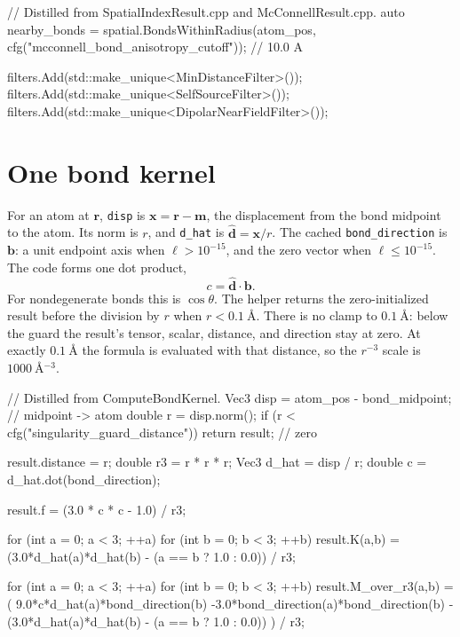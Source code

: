 \documentclass[11pt]{article}
\newcommand{\code}[1]{\texttt{#1}}
\begin{document}
\begin{codebox}
// Distilled from SpatialIndexResult.cpp and McConnellResult.cpp.
auto nearby_bonds =
    spatial.BondsWithinRadius(atom_pos,
        cfg("mcconnell_bond_anisotropy_cutoff"));  // 10.0 A

filters.Add(std::make_unique<MinDistanceFilter>());
filters.Add(std::make_unique<SelfSourceFilter>());
filters.Add(std::make_unique<DipolarNearFieldFilter>());
\end{codebox}

\section{One bond kernel}

For an atom at \(\bm r\), \code{disp} is
\(\bm x=\bm r-\bm m\), the displacement from the bond midpoint to the atom.
Its norm is \(r\), and \code{d\_hat} is
\(\hat{\bm d}=\bm x/r\). The cached \code{bond\_direction} is
\(\bm b\): a unit endpoint axis when \(\ell>10^{-15}\), and the zero vector
when \(\ell\le 10^{-15}\). The code forms one dot product,
\[
  c = \hat{\bm d}\cdot\bm b .
\]
For nondegenerate bonds this is \(\cos\theta\).
The helper returns the zero-initialized result before the division by \(r\)
when \(r<\SI{0.1}{\angstrom}\). There is no clamp to
\(\SI{0.1}{\angstrom}\): below the guard the result's tensor, scalar, distance,
and direction stay at zero. At exactly \(\SI{0.1}{\angstrom}\) the formula is
evaluated with that distance, so the \(r^{-3}\) scale is
\(\SI{1000}{\angstrom^{-3}}\).

\begin{codebox}
// Distilled from ComputeBondKernel.
Vec3 disp = atom_pos - bond_midpoint;      // midpoint -> atom
double r = disp.norm();
if (r < cfg("singularity_guard_distance")) return result;  // zero

result.distance = r;
double r3 = r * r * r;
Vec3 d_hat = disp / r;
double c = d_hat.dot(bond_direction);

result.f = (3.0 * c * c - 1.0) / r3;

for (int a = 0; a < 3; ++a)
    for (int b = 0; b < 3; ++b)
        result.K(a,b) =
            (3.0*d_hat(a)*d_hat(b) - (a == b ? 1.0 : 0.0)) / r3;

for (int a = 0; a < 3; ++a)
    for (int b = 0; b < 3; ++b)
        result.M_over_r3(a,b) =
            ( 9.0*c*d_hat(a)*bond_direction(b)
             -3.0*bond_direction(a)*bond_direction(b)
             -(3.0*d_hat(a)*d_hat(b) - (a == b ? 1.0 : 0.0)) ) / r3;
\end{codebox}
\end{document}
